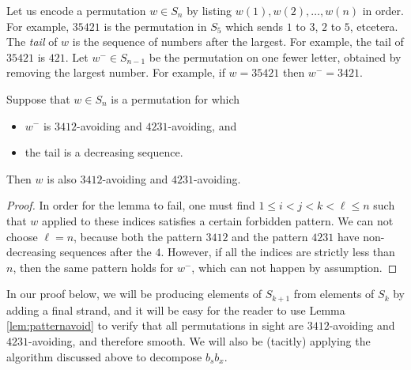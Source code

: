 \begin{lemma} \label{lem:patternavoid} Let us encode a permutation $w \in S_n$ by listing $w(1), w(2), \ldots, w(n)$ in order. For example, $35421$ is the permutation in $S_5$ which
sends $1$ to $3$, $2$ to $5$, etcetera.  The \emph{tail} of $w$ is the sequence of numbers after the largest. For example, the tail of $35421$ is $421$. Let $w^- \in S_{n-1}$ be the permutation on one fewer letter, obtained by removing the largest number. For example, if $w = 35421$ then $w^- =
3421$.

Suppose that $w \in S_n$ is a permutation for which \begin{itemize} \item $w^-$ is $3412$-avoiding and $4231$-avoiding, and \item the tail is a decreasing sequence. \end{itemize} Then $w$ is also $3412$-avoiding and $4231$-avoiding. \end{lemma}

\begin{proof} In order for the lemma to fail, one must find $1 \le i < j < k < \ell \le n$ such that $w$ applied to these indices satisfies a certain forbidden pattern. We can not choose
$\ell = n$, because both the pattern $3412$ and the pattern $4231$ have non-decreasing sequences after the $4$. However, if all the indices are strictly less than $n$, then the same
pattern holds for $w^-$, which can not happen by assumption. \end{proof}

In our proof below, we will be producing elements of $S_{k+1}$ from elements of $S_{k}$ by adding a final strand, and it will be easy for the reader to use Lemma \ref{lem:patternavoid} to
verify that all permutations in sight are $3412$-avoiding and $4231$-avoiding, and therefore smooth. We will also be (tacitly) applying the algorithm discussed above to decompose $b_s
b_x$.

